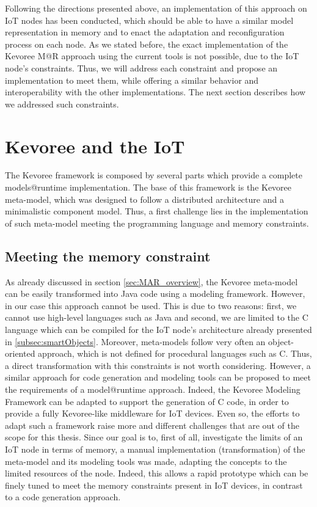 Following the directions presented above, an implementation of this approach on IoT nodes has been conducted, which should be able to have a similar model representation in memory and to enact the adaptation and reconfiguration process on each node.
As we stated before, the exact implementation of the Kevoree M@R approach using the current tools is not possible, due to the IoT node's constraints.
Thus, we will address each constraint and propose an implementation to meet them, while offering a similar behavior and interoperability with the other implementations.
The next section describes how we addressed such constraints.

\section{Kevoree and the IoT}
\label{sec:kevAndIoT}
The Kevoree framework is composed by several parts which provide a complete models@runtime implementation.
The base of this framework is the Kevoree meta-model, which was designed to follow a distributed architecture and a minimalistic component model.
Thus, a first challenge lies in the implementation of such meta-model meeting the programming language and memory constraints.

\subsection{Meeting the memory constraint}
As already discussed in section \ref{sec:MAR_overview}, the Kevoree meta-model can be easily transformed into Java code using a modeling framework.
However, in our case this approach cannot be used.
This is due to two reasons: first, we cannot use high-level languages such as Java and second, we are limited to the C language which can be compiled for the IoT node's architecture already presented in \ref{subsec:smartObjects}.
Moreover, meta-models follow very often an object-oriented approach, which is not defined for procedural languages such as C.
Thus, a direct transformation with this constraints is not worth considering.
However, a similar approach for code generation and modeling tools can be proposed to meet the requirements of a model@runtime approach.
Indeed, the Kevoree Modeling Framework\cite{fouquet2012eclipse} can be adapted to support the generation of C code, in order to provide a fully Kevoree-like middleware for IoT devices.
Even so, the efforts to adapt such a framework raise more and different challenges that are out of the scope for this thesis.
Since our goal is to, first of all, investigate the limits of an IoT node in terms of memory, a manual implementation (transformation) of the meta-model and its modeling tools was made, adapting the concepts to the limited resources of the node.
Indeed, this allows a rapid prototype which can be finely tuned to meet the memory constraints present in IoT devices, in contrast to a code generation approach.

